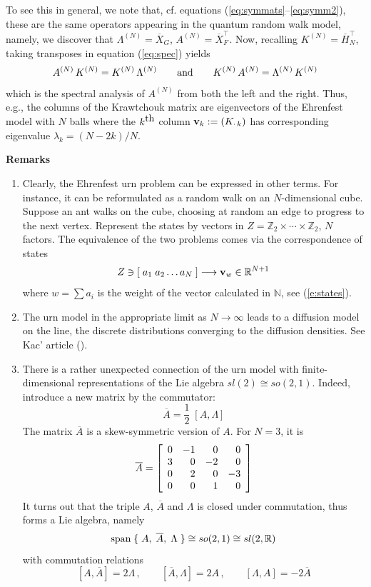 \documentclass[12pt]{article}
\def\?#1?{{\bf #1}}
\numberwithin{equation}{section}
\begin{document}
To see this in general, we note that, cf. equations (\ref{eq:symmats}--\ref{eq:symm2}), 
these are the same operators appearing in the quantum random walk model, namely, we discover that
$\Lambda^{(N)}=\overline{X}_G$, $A^{(N)}=\overline{X}_F^\top$. Now, recalling
$K^{(N)}=\overline{H}_N^\top$, taking transposes in equation (\ref{eq:spec}) yields
$$
A^{(N)}\, K^{(N)} = K^{(N)}\, \Lambda^{(N)} \qquad\hbox{and}\qquad K^{(N)}\, A^{(N)} = \Lambda^{(N)}\, K^{(N)} 
$$
which is the spectral analysis of $A^{(N)}$ from both the left and the right.
Thus, e.g.,  the columns of the Krawtchouk matrix are eigenvectors of the Ehrenfest model
with $N$ balls  
where the $k^{\hbox{th}}$ column $\?v?_k:= (K_{\cdot\,k})$ has corresponding eigenvalue
$\lambda_k=(N-2k)/N$.  
\bigskip

\noindent
{\bf Remarks }
\begin{enumerate}
\item Clearly, the Ehrenfest urn problem can be expressed in other
terms. For instance, it can be reformulated as a
random walk on an $N$-dimensional cube.
Suppose an ant walks on the cube, 
choosing at random an edge to progress to the next vertex.  
Represent the states by vectors in $Z=\mathbb{Z}_2\times\cdots\times\mathbb{Z}_2$, $N$ factors.      
The equivalence of the two problems comes via the 
correspondence of states 
$$
Z\ni [\;a_1\;a_2\ldots a_N\;]
\longrightarrow \?v?_w\in \mathbb{R}^{N+1}
$$
where $w = \sum a_i$ is the weight of the vector calculated in $\mathbb{N}$,
see (\ref{e:states}).\\

\item  The urn model in the appropriate limit as $N\to\infty$ leads to a diffusion model on the line,
the discrete distributions converging to the diffusion densities. See Kac' article (\cite{Kac}).\\

\item There is a rather unexpected connection of the urn model 
with finite-dimensional representations of the Lie algebra $sl(2)\cong so(2,1)$.
Indeed, introduce a new matrix by the commutator:
$$
\overline{A} = \frac{1}{2}\;[A,\Lambda]
$$
The matrix $\overline{A}$ is a skew-symmetric version of $A$.
For $N=3$, it is 
$$
\overline{A}= \left[\begin{array}{rrrr} 
                0 & -1 & 0 & 0 \cr
                3 & 0 & -2 & 0 \cr
                0 & 2 & 0 & -3 \cr
                0 & 0 & 1 & 0 \cr \end{array}\right]
$$
It turns out that the triple $A$, $\overline{A}$ and $\Lambda$
is closed under commutation, thus forms a Lie algebra, namely
$$
\hbox{span}\;\{\;A,\;\overline{A},\;\Lambda\;\} 
             \cong so(2,1)
             \cong sl(2,\mathbb{R})
$$
with commutation relations
$$
[ A, \overline{A} ]     = 2\Lambda \,,\qquad
[\overline{A},\Lambda ] = 2A \,,\qquad
[ \Lambda, A ]          = -2 \overline{A} 
$$  
\end{enumerate}
\end{document}
